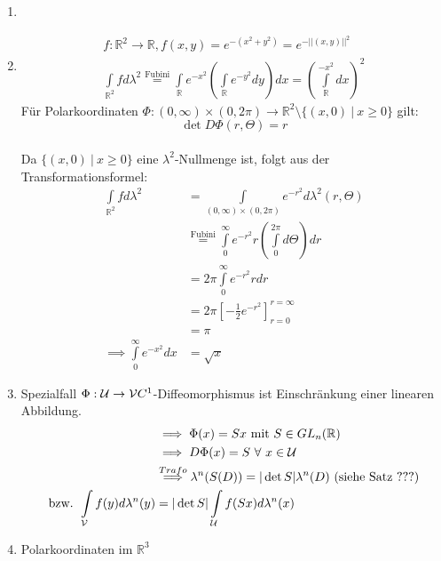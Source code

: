   \begin{example}
    \begin{enumerate}
      \item[]
      \item
        \begin{align*}
          f:\mathbb{R}^2 \to \mathbb{R}, f(x,y) = e^{-(x^2+y^2)} = e^{-||(x,y)||^2}\\
          \int\limits_{\mathbb{R}^2} f d\lambda^2 \stackrel{\text{Fubini}}{=} \int\limits_{\mathbb{R}} e^{-x^2}(\int\limits_{\mathbb{R}} e^{-y^2} dy) dx = (\int\limits_{\mathbb{R}}^{-x^2} dx)^2
        \end{align*}
        Für Polarkoordinaten $\Phi:(0,\infty) \times (0,2\pi) \to \mathbb{R}^2 \setminus \{(x,0) \ | \ x \geq 0\}$ gilt: \\
        $$\det D\Phi(r,\Theta) = r$$\\
        Da $\{(x,0) \ | \ x \geq 0\}$ eine $\lambda^2$-Nullmenge ist, folgt aus der Transformationsformel:
        \begin{align*}
          \int\limits_{\mathbb{R}^2} f d\lambda^2
          &= \int\limits_{(0,\infty) \times (0,2\pi)} e^{-r^2} d\lambda^2(r,\Theta)\\
          &\stackrel{\text{Fubini}}{=} \int\limits_0^{\infty} e^{-r^2}r(\int\limits_0^{2\pi}d\Theta)dr\\
          &= 2\pi \int\limits_0^{\infty} e^{-r^2} r dr\\
          &= 2\pi [-\frac{1}{2} e^{-r^2}]_{r=0}^{r=\infty}\\
          &= \pi\\
          \implies \int\limits_0^{\infty} e^{-x^2} dx &= \sqrt{x}
        \end{align*}
      \item Spezialfall $\Phi: \mathcal{U} \to \mathcal{V} C^1$-Diffeomorphismus ist Einschränkung einer linearen Abbildung.
        \begin{align*}
          &\implies \Phi(x) = Sx \text{ mit } S\in GL_n(\mathbb{R})\\
          &\implies D\Phi(x) = S \ \forall \ x \in \mathcal{U}\\
          &\stackrel{Trafo}{\implies} \lambda^n(S(D)) = |\det S| \lambda^n(D) \text{ (siehe Satz ???)}\\
          \text{bzw. } \int\limits_{\mathcal{V}} f(y) d\lambda^n(y) &= |\det S| \int\limits_{\mathcal{U}} f(Sx) d\lambda^n(x)
        \end{align*}
      \item Polarkoordinaten im $\mathbb{R}^3$\\

\end{enumerate}
\end{example}
